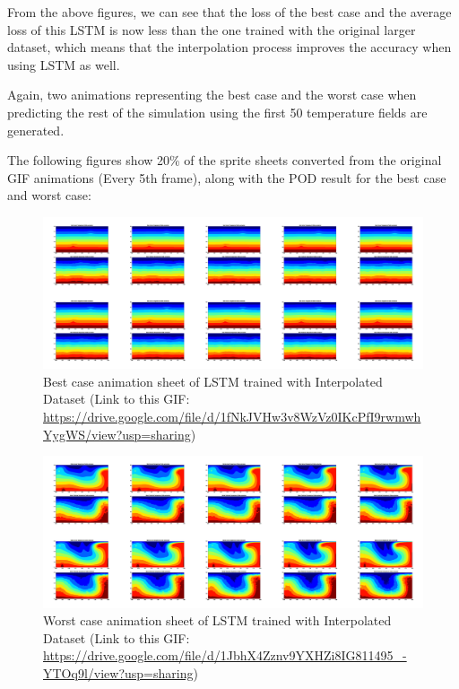 From the above figures, we can see that the loss of the best case and the average loss of this LSTM is now less than the one trained with the original larger dataset, which means that the interpolation process improves the accuracy when using LSTM as well.

Again, two animations representing the best case and the worst case when predicting the rest of the simulation using the first 50 temperature fields are generated.

The following figures show 20\% of the sprite sheets converted from the original GIF animations (Every 5th frame), along with the POD result for the best case and worst case:

\begin{figure}[H]
    \centering
    \caption{Best case animation sheet of LSTM trained with Interpolated Dataset (Link to this GIF: \url{https://drive.google.com/file/d/1fNkJVHw3v8WzVz0IKcPfI9rwmwhYygWS/view?usp=sharing})}
    \includegraphics[scale=0.10]{figures/mantle_convection_images/larger_dataset_interpolated/LSTM_Best_GIF_sheet.png}
\end{figure}

\begin{figure}[H]
    \centering
    \caption{Worst case animation sheet of LSTM trained with Interpolated Dataset (Link to this GIF: 
    \url{https://drive.google.com/file/d/1JbhX4Zznv9YXHZi8IG811495_-YTOq9l/view?usp=sharing})}
    \includegraphics[scale=0.10]{figures/mantle_convection_images/larger_dataset_interpolated/LSTM_Worst_GIF_sheet.png}
\end{figure}


